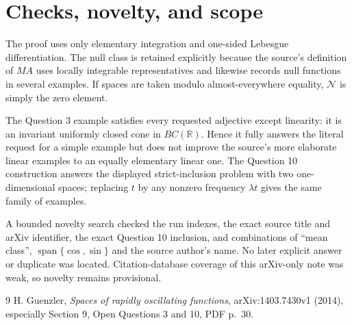 \documentclass[11pt]{article}
\newcommand{\R}{\mathbb R}
\newcommand{\Nul}{\mathcal N}
\begin{document}
\section*{Checks, novelty, and scope}

The proof uses only elementary integration and one-sided Lebesgue
differentiation.  The null class is retained explicitly because the source's
definition of $MA$ uses locally integrable representatives and likewise
records null functions in several examples.  If spaces are taken modulo
almost-everywhere equality, $\Nul$ is simply the zero element.

The Question 3 example satisfies every requested adjective except linearity:
it is an invariant uniformly closed cone in $BC(\R)$.  Hence it fully answers
the literal request for a simple example but does not improve the source's
more elaborate linear examples to an equally elementary linear one.  The
Question 10 construction answers the displayed strict-inclusion problem with
two one-dimensional spaces; replacing $t$ by any nonzero frequency
$\lambda t$ gives the same family of examples.

A bounded novelty search checked the run indexes, the exact source title and
arXiv identifier, the exact Question 10 inclusion, and combinations of
``mean class'', $\operatorname{span}\{\cos,\sin\}$ and the source author's
name.  No later explicit answer or duplicate was located.  Citation-database
coverage of this arXiv-only note was weak, so novelty remains provisional.

\begin{thebibliography}{9}
H. Guenzler,
\emph{Spaces of rapidly oscillating functions},
arXiv:1403.7430v1 (2014), especially Section 9, Open Questions 3 and 10,
PDF p.~30.
\end{thebibliography}
\end{document}
